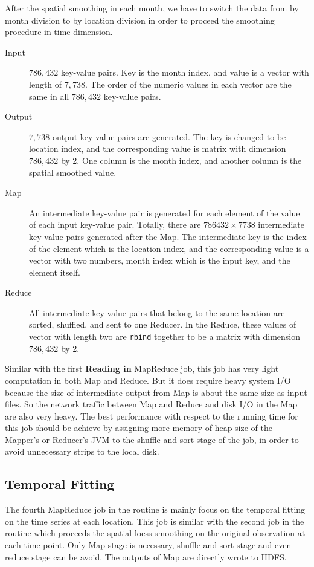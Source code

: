After the spatial smoothing in each month, we have to switch the data from by 
month division to by location division in order to proceed the smoothing procedure
in time dimension. 

\begin{description}
\item[Input] $786,432$ key-value pairs. Key is the month index, and value is a 
vector with length of $7,738$. The order of the numeric values in each vector are 
the same in all $786,432$ key-value pairs.
\item[Output] $7,738$ output key-value pairs are generated. The key is changed
to be location index, and the corresponding value is matrix with dimension 
$786,432$ by 2. One column is the month index, and another column is the spatial
smoothed value.
\item[Map]An intermediate key-value pair is generated for each element of the
value of each input key-value pair. Totally, there are $786432 \times 7738$ 
intermediate key-value pairs generated after the Map. The intermediate key is the 
index of the element which is the location index, and the corresponding value is 
a vector with two numbers, month index which is the input key, and the element 
itself.   
\item[Reduce] All intermediate key-value pairs that belong to the same location
are sorted, shuffled, and sent to one Reducer. In the Reduce, these values of
vector with length two are \texttt{rbind} together to be a matrix with dimension
$786,432$ by 2.
\end{description}

Similar with the first \textbf{Reading in} MapReduce job, this job has very light
computation in both Map and Reduce. But it does require heavy system I/O because
the size of intermediate output from Map is about the same size as input files.
So the network traffic between Map and Reduce and disk I/O in the Map are also 
very heavy. The best performance with respect to the running time for this job
should be achieve by assigning more memory of heap size of the Mapper's or 
Reducer's JVM to the shuffle and sort stage of the job, in order to avoid 
unnecessary strips to the local disk.

\subsection{Temporal Fitting}

The fourth MapReduce job in the routine is mainly focus on the temporal fitting
on the time series at each location. This job is similar with the second job in
the routine which proceeds the spatial loess smoothing on the original observation
at each time point. Only Map stage is necessary, shuffle and sort stage and even
reduce stage can be avoid. The outputs of Map are directly wrote to HDFS.

